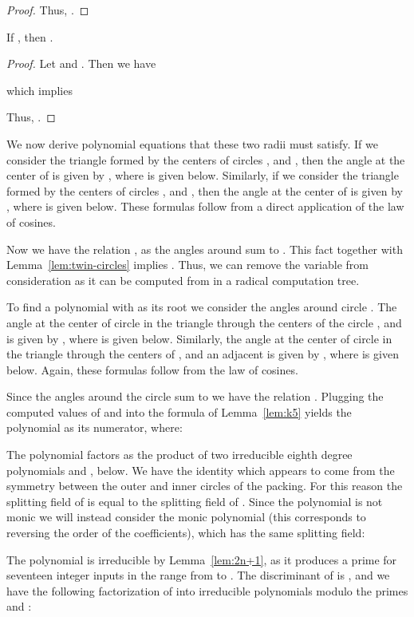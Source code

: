 \documentclass[oribibl,10pt]{llncs}
\begin{document}
\begin{appendix}
\begin{proof}
Thus, .
\end{proof}

\begin{lemma}\label{lem:k5}
If , then .
\end{lemma}

\begin{proof}
Let  and . Then we have

which implies

Thus, .
\end{proof}

We now derive polynomial equations that these two radii must satisfy.
If we consider the triangle formed by the centers of circles ,  and , then the angle at the center of  is given by , where  is given below. Similarly, if we consider the triangle formed by the centers of circles ,  and , then the angle at the center of  is given by , where  is given below. These formulas follow from a direct application of the law of cosines.

Now we have the relation , as the angles around  sum to . This fact together with Lemma~\ref{lem:twin-circles} implies . Thus, we can remove the variable  from consideration as it can be computed from  in a radical computation tree.

To find a polynomial with  as its root we consider the angles around circle . The angle at the center of circle  in the triangle through the centers of the circle ,  and  is given by , where  is given below. Similarly, the angle at the center of circle  in the triangle through the centers of ,  and an adjacent  is given by , where  is given below. Again, these formulas follow from the law of cosines.



Since the angles around the circle  sum to  we have the relation . Plugging the computed values of  and  into the formula of Lemma~\ref{lem:k5} yields the polynomial  as its numerator, where:


The polynomial  factors as the product of two irreducible eighth degree polynomials  and , below. We have the identity  which appears to come from the symmetry between the outer and inner circles of the packing. For this reason the splitting field of  is equal to the splitting field of . Since the polynomial  is not monic we will instead consider the monic polynomial  (this corresponds to reversing the order of the coefficients), which has the same splitting field:


The polynomial  is irreducible by Lemma~\ref{lem:2n+1}, as it produces a prime for seventeen integer inputs in the range from  to .
The discriminant of  is , and we have the following factorization of  into irreducible polynomials modulo the primes  and :


\end{appendix}
\end{document}
